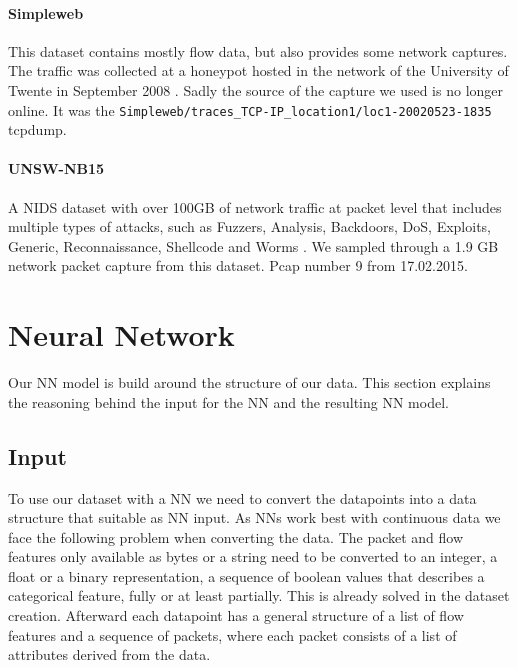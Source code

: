 \documentclass[
	ngerman,
	ruledheaders=section,%
	class=report,%
	thesis={type=bachelor},%
	accentcolor=9c,%
	custommargins=true,%
	marginpar=false,%
	parskip=half-,%
	fontsize=11pt,%
	twoside
]{tudapub}
\let\code\texttt
\begin{document}
\paragraph{Simpleweb} This dataset contains mostly flow data, but also provides some network captures.
The traffic was collected at a honeypot hosted in the network of the University of Twente in September 2008 \cite{LabeledDatasetIntrusiona}.
Sadly the source of the capture we used is no longer online.
It was the \code{Simpleweb/traces\_TCP-IP\_location1/loc1-20020523-1835} tcpdump.

\paragraph{UNSW-NB15} A NIDS dataset with over 100GB of network traffic at packet level that includes multiple types of attacks, such as Fuzzers, Analysis, Backdoors, DoS, Exploits, Generic, Reconnaissance, Shellcode and Worms \cite{UNSWNB15DataSet}.
We sampled through a 1.9 GB network packet capture from this dataset.
Pcap number 9 from 17.02.2015.

\section{Neural Network}
\label{sec:NN}

Our NN model is build around the structure of our data.
This section explains the reasoning behind the input for the NN and the resulting NN model.

\subsection{Input}
\label{sec:NNinput}

To use our dataset with a NN we need to convert the datapoints into a data structure that suitable as NN input.
As NNs work best with continuous data we face the following problem when converting the data.
The packet and flow features only available as bytes or a string need to be converted to an integer, a float or a binary representation, a sequence of boolean values that describes a categorical feature, fully or at least partially.
This is already solved in the dataset creation.
Afterward each datapoint has a general structure of a list of flow features and a sequence of packets, where each packet consists of a list of attributes derived from the data.
\end{document}
